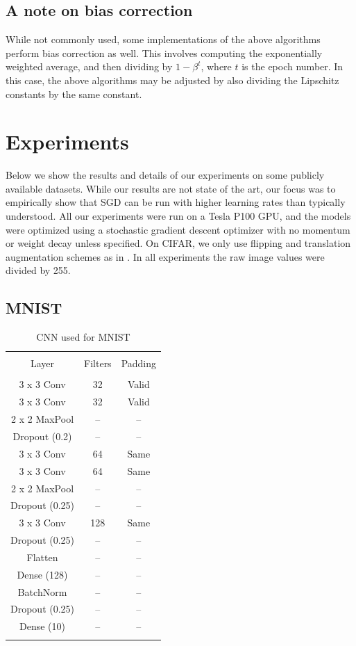 \documentclass{article}
\begin{document}
\subsection{A note on bias correction}
While not commonly used, some implementations of the above algorithms perform bias correction as well. This involves computing the exponentially weighted average, and then dividing by $1 - \beta^t$, where $t$ is the epoch number. In this case, the above algorithms may be adjusted by also dividing the Lipschitz constants by the same constant.

\section{Experiments}
Below we show the results and details of our experiments on some publicly available datasets. While our results are not state of the art, our focus was to empirically show that SGD can be run with higher learning rates than typically understood. All our experiments were run on a Tesla P100 GPU, and the models were optimized using a stochastic gradient descent optimizer with no momentum or weight decay unless specified. On CIFAR, we only use flipping and translation augmentation schemes as in \cite{he2016deep}. In all experiments the raw image values were divided by 255.

\subsection{MNIST}
\begin{table}
    \centering
    \caption{CNN used for MNIST}
    \begin{tabular}{ccc}
        \toprule \\
        Layer & Filters & Padding \\
        \midrule \\
        3 x 3 Conv & 32 & Valid  \\
        3 x 3 Conv & 32 & Valid  \\
        2 x 2 MaxPool & -- & -- \\
        Dropout (0.2) & -- & -- \\
        3 x 3 Conv & 64 & Same \\
        3 x 3 Conv & 64 & Same \\
        2 x 2 MaxPool & -- & -- \\
        Dropout (0.25) & -- & -- \\
        3 x 3 Conv & 128 & Same \\
        Dropout (0.25) & -- & -- \\
        Flatten & -- & -- \\
        Dense (128) & -- & -- \\
        BatchNorm & -- & -- \\
        Dropout (0.25) & -- & -- \\
        Dense (10) & -- & -- \\
        \bottomrule \\
    \end{tabular}
    \label{tab:mnist:1}
\end{table}
\end{document}
